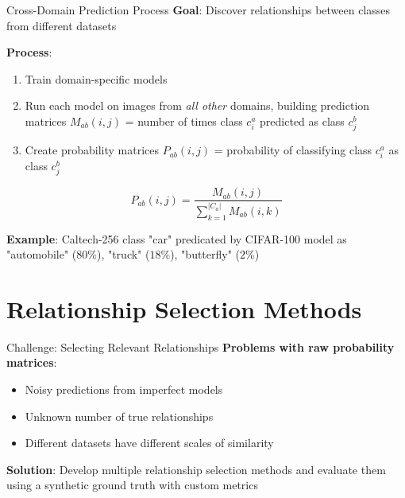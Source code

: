 \documentclass[aspectratio=169]{beamer}
\begin{document}
\begin{frame}{Cross-Domain Prediction Process}
    \textbf{Goal}: Discover relationships between classes from different datasets

    \vspace{0.5em}

    \textbf{Process}:
    \begin{enumerate}
        \item Train domain-specific models
        \item Run each model on images from \emph{all other} domains, building prediction matrices $M_{ab}(i,j)$ = number of times class $c_i^a$ predicted as class $c_j^b$
        \item Create probability matrices $P_{ab}(i,j)$ = probability of classifying class $c_i^a$ as class $c_j^b$
    \end{enumerate}

    \vspace{0.5em}

    \begin{equation}
        P_{ab}(i, j) = \frac{M_{ab}(i, j)}{\sum_{k=1}^{|C_a|} M_{ab}(i, k)}
    \end{equation}

    \vspace{0.5em}

    \textbf{Example}: Caltech-256 class "car" predicated by CIFAR-100 model as "automobile" ($80\%$), "truck" ($18\%$), "butterfly" ($2\%$)
\end{frame}

\section{Relationship Selection Methods}

\begin{frame}{Challenge: Selecting Relevant Relationships}
    \textbf{Problems with raw probability matrices}:
    \begin{itemize}
        \item Noisy predictions from imperfect models
        \item Unknown number of true relationships
        \item Different datasets have different scales of similarity
    \end{itemize}

    \vspace{1em}

    \textbf{Solution}: Develop multiple relationship selection methods and evaluate them using a synthetic ground truth with custom metrics
\end{frame}
\end{document}
